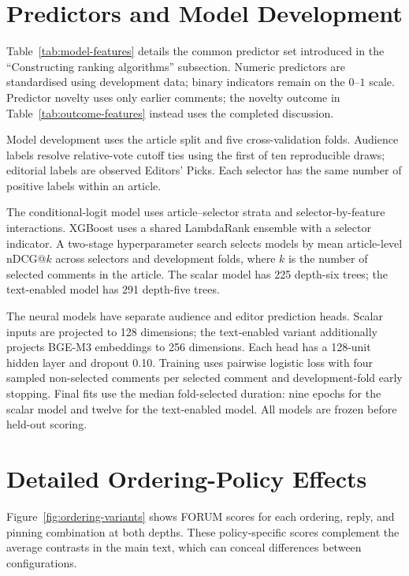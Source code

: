 \section{Predictors and Model Development}
\label{app:development}
\label{app:feature-operationalisation}
Table~\ref{tab:model-features} details the common predictor set introduced in the ``Constructing ranking algorithms'' subsection. Numeric predictors are standardised using development data; binary indicators remain on the $0$--$1$ scale. Predictor novelty uses only earlier comments; the novelty outcome in Table~\ref{tab:outcome-features} instead uses the completed discussion.

Model development uses the article split and five cross-validation folds. Audience labels resolve relative-vote cutoff ties using the first of ten reproducible draws; editorial labels are observed Editors' Picks. Each selector has the same number of positive labels within an article.

The conditional-logit model uses article--selector strata and selector-by-feature interactions. XGBoost uses a shared LambdaRank ensemble with a selector indicator. A two-stage hyperparameter search selects models by mean article-level nDCG@$k$ across selectors and development folds, where $k$ is the number of selected comments in the article. The scalar model has 225 depth-six trees; the text-enabled model has 291 depth-five trees.

The neural models have separate audience and editor prediction heads. Scalar inputs are projected to 128 dimensions; the text-enabled variant additionally projects BGE-M3 embeddings to 256 dimensions. Each head has a 128-unit hidden layer and dropout 0.10. Training uses pairwise logistic loss with four sampled non-selected comments per selected comment and development-fold early stopping. Final fits use the median fold-selected duration: nine epochs for the scalar model and twelve for the text-enabled model. All models are frozen before held-out scoring.

\section{Detailed Ordering-Policy Effects}
\label{app:ordering}
Figure~\ref{fig:ordering-variants} shows FORUM scores for each ordering, reply, and pinning combination at both depths. These policy-specific scores complement the average contrasts in the main text, which can conceal differences between configurations.

